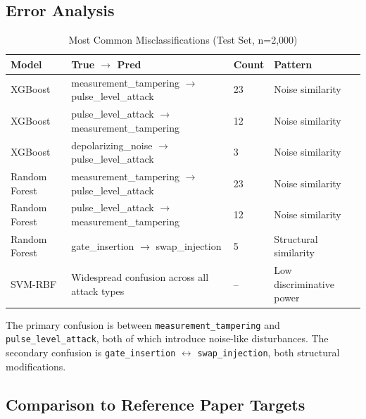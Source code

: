 \subsection{Error Analysis}

\begin{table}[H]
\centering
\caption{Most Common Misclassifications (Test Set, n=2,000)}
\label{tab:errors}
\begin{tabular}{llll}
\toprule
\textbf{Model} & \textbf{True} $\rightarrow$ \textbf{Pred} & \textbf{Count} & \textbf{Pattern} \\
\midrule
XGBoost & measurement\_tampering $\rightarrow$ pulse\_level\_attack & 23 & Noise similarity \\
XGBoost & pulse\_level\_attack $\rightarrow$ measurement\_tampering & 12 & Noise similarity \\
XGBoost & depolarizing\_noise $\rightarrow$ pulse\_level\_attack & 3 & Noise similarity \\
Random Forest & measurement\_tampering $\rightarrow$ pulse\_level\_attack & 23 & Noise similarity \\
Random Forest & pulse\_level\_attack $\rightarrow$ measurement\_tampering & 12 & Noise similarity \\
Random Forest & gate\_insertion $\rightarrow$ swap\_injection & 5 & Structural similarity \\
SVM-RBF & Widespread confusion across all attack types & -- & Low discriminative power \\
\bottomrule
\end{tabular}
\end{table}

The primary confusion is between \texttt{measurement\_tampering} and \texttt{pulse\_level\_attack}, both of which introduce noise-like disturbances. The secondary confusion is \texttt{gate\_insertion} $\leftrightarrow$ \texttt{swap\_injection}, both structural modifications.

\subsection{Comparison to Reference Paper Targets}

